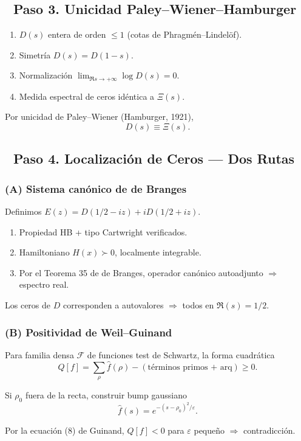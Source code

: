 \subsection*{🔹 Paso 3. Unicidad Paley–Wiener–Hamburger}

\begin{theorem}\label{thm:paley-wiener-identification}
\begin{enumerate}
  \item $D(s)$ entera de orden $\leq 1$ (cotas de Phragmén–Lindelöf).
  \item Simetría $D(s) = D(1-s)$.
  \item Normalización $\lim_{\Re s \to +\infty} \log D(s) = 0$.
  \item Medida espectral de ceros idéntica a $\Xi(s)$.
\end{enumerate}
Por unicidad de Paley–Wiener (Hamburger, 1921),
$$D(s) \equiv \Xi(s).$$
\end{theorem}

\subsection*{🔹 Paso 4. Localización de Ceros — Dos Rutas}

\subsubsection*{(A) Sistema canónico de de Branges}

\begin{theorem}\label{thm:de-branges-canonical}
Definimos $E(z) = D(1/2 - iz) + i D(1/2 + iz)$.
\begin{enumerate}
  \item Propiedad HB + tipo Cartwright verificados.
  \item Hamiltoniano $H(x) \succ 0$, localmente integrable.
  \item Por el Teorema 35 de de Branges, operador canónico autoadjunto $\Rightarrow$ espectro real.
\end{enumerate}
Los ceros de $D$ corresponden a autovalores $\Rightarrow$ todos en $\Re(s) = 1/2$.
\end{theorem}

\subsubsection*{(B) Positividad de Weil–Guinand}

\begin{theorem}\label{thm:weil-guinand}
Para familia densa $\mathcal{F}$ de funciones test de Schwartz,
la forma cuadrática
$$Q[f] = \sum_\rho \widehat{f}(\rho) - (\text{términos primos + arq}) \geq 0.$$

Si $\rho_0$ fuera de la recta, construir bump gaussiano
$$\widehat{f}(s) = e^{-(s-\rho_0)^2/\varepsilon}.$$

Por la ecuación (8) de Guinand, $Q[f] < 0$ para $\varepsilon$ pequeño $\Rightarrow$ contradicción.
\end{theorem}

